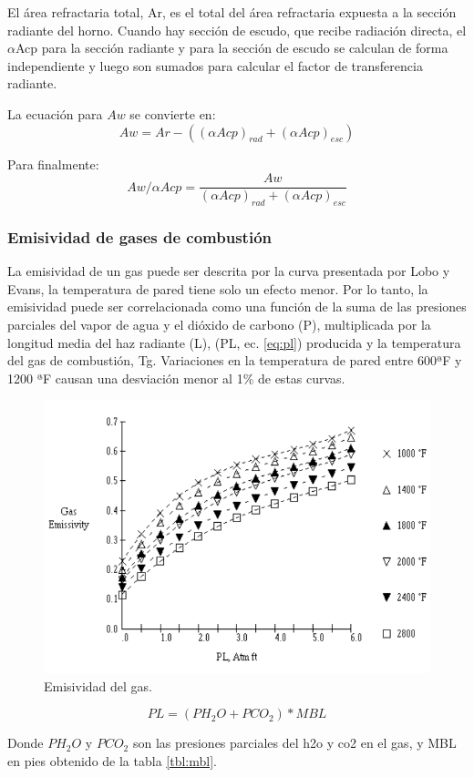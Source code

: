 \par El área refractaria total, Ar, es el total del área refractaria expuesta a la sección radiante del horno. Cuando hay sección de escudo, que recibe radiación directa, el $\alpha$Acp para la sección radiante y para la sección de escudo se calculan de forma independiente y luego son sumados para calcular el factor de transferencia radiante.
\par La ecuación para $Aw$ se convierte en:
\begin{equation}
Aw = Ar - ((\alpha Acp)_{rad} + (\alpha Acp)_{esc})   
\end{equation}
\par Para finalmente:
\begin{equation}
\label{eq:aw-acp}
Aw/\alpha Acp = \frac{Aw}{(\alpha Acp)_{rad} + (\alpha Acp)_{esc}}
\end{equation}
\subsubsection{Emisividad de gases de combustión}
\par La emisividad de un gas puede ser descrita por la curva presentada por Lobo y Evans\cite{bib:rad}, la temperatura de pared tiene solo un efecto menor. Por lo tanto, la emisividad puede ser correlacionada como una función de la suma de las presiones parciales del vapor de agua y el dióxido de carbono (P), multiplicada por la longitud media del haz radiante (L), (PL, ec. \ref{eq:pl}) producida y la temperatura del gas de combustión, Tg. Variaciones en la temperatura de pared entre 600ªF y 1200 ªF causan una desviación menor al 1\% de estas curvas.

\begin{figure}[hbt]
\begin{center}
\includegraphics[scale=0.45]{images/emiss}
\caption[Emisividad del gas]{Emisividad del gas.\cite{bib:mekler}}
\label{fig:emiss}
\end{center}
\end{figure}
\begin{equation}
\label{eq:pl}
PL = (PH_2O + PCO_2) * MBL
\end{equation}
\par Donde $PH_2O$ y $PCO_2$ son las presiones parciales del \ac{h2o} y \ac{co2} en el gas, y MBL en pies obtenido de la tabla \ref{tbl:mbl}.

